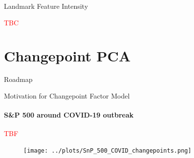 \documentclass{beamer}
\begin{document}

\begin{frame}{Landmark Feature Intensity}

    \textcolor{red}{TBC}

\end{frame}



\section{Changepoint PCA}




\begin{frame}{Roadmap}
\tableofcontents[currentsection]
\end{frame}




\begin{frame}{Motivation for Changepoint Factor Model}
\framesubtitle{S\&P 500 around COVID-19 outbreak}
    
\textcolor{red}{TBF}
    
\begin{figure}
    \centering
    \texttt{[image: ../plots/SnP\_500\_COVID\_changepoints.png]}
\end{figure}
    
\end{frame}



\end{document}
